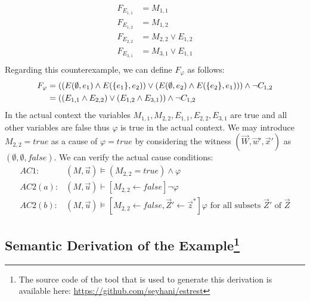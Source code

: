 \documentclass{article}
\begin{document}
\begin{align*}
    F_{E_{1,1}} & = M_{1,1} \\
    F_{E_{1,2}} & = M_{1,2} \\
    F_{E_{2,2}} & = M_{2,2} \vee E_{1,2} \\
    F_{E_{3,1}} & = M_{3,1} \vee E_{1,1} \\
\end{align*}
Regarding this counterexample, we can define $F_{\varphi}$ as follows:
\begin{align*}
    F_{\varphi} & =
    \left(
    \left(
    E(\emptyset, e_1) \wedge E(\{e_1\},e_2)
    \right)
    \vee
    \left(
    E(\emptyset, e_2) \wedge E(\{e_2\}, e_1)
    \right)
    \right) \wedge \neg C_{1,2} \\
                & = \left(
    \left(E_{1,1} \wedge E_{2,2}\right) \vee
    \left(E_{1,2} \wedge E_{3,1}\right)
    \right) \wedge \neg C_{1,2}
\end{align*}
In the actual context the variables 
$M_{1,1}, M_{2,2}, E_{1,1},E_{2,2},E_{3,1}$ are true 
and all other variables are false thus $\varphi$ is true in the actual context.
We may introduce $M_{2,2} = true$ as a cause of $\varphi = true$
by considering the witness $(\vec W, \vec w', \vec x')$ as $(\emptyset, \emptyset, false)$.
We can verify the actual cause conditions:
\begin{align*}
    AC1:     & (M,\vec u) \vDash (M_{2,2} = true) \wedge \varphi                                  \\
    AC2(a) : & (M, \vec u) \vdash [M_{2,2} \leftarrow false] \neg \varphi                         \\
    AC2(b) : & (M, \vec u) \vDash [M_{2,2} \leftarrow false, \vec Z' \leftarrow \vec z^*] \varphi
    \text{ for all subsets } \vec Z' \text{ of } \vec Z
\end{align*}

\pagebreak
\begin{appendices}
    \section{Semantic Derivation of the Example\protect\footnote[1]
      {The source code of the tool that is used to
          generate this derivation is available here:
          \href{https://github.com/seyhani/estrest}
          {https://github.com/seyhani/estrest}
      }
     }
\end{appendices}
\end{document}
